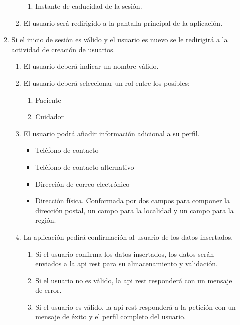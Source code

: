 \begin{enumerate}[label*=RSU \arabic*.]
\begin{enumerate}[label*=\arabic*.]
\begin{enumerate}[label*=\arabic*.]
\begin{enumerate}[label*=\arabic*.]
                \item Instante de caducidad de la sesión.
            \end{enumerate}
            \item El usuario será redirigido a la pantalla principal de la aplicación.
        \end{enumerate}
        \item \label{req:registro} Si el inicio de sesión es válido y el usuario es nuevo se le redirigirá a la actividad de creación de usuarios.
        \begin{enumerate}[label*=\arabic*.]
            \item \label{req:nombre_usuario} El usuario deberá indicar un nombre válido.
            \item \label{req:rol_usuario} El usuario deberá seleccionar un rol entre los posibles:
            \begin{enumerate}[label*=\arabic*.]
                \item Paciente
                \item Cuidador
            \end{enumerate}
            \item \label{req:info_adicional} El usuario podrá añadir información adicional a su perfil.
            \begin{itemize}
                \item Teléfono de contacto
                \item Teléfono de contacto alternativo
                \item Dirección de correo electrónico
                \item Dirección física. Conformada por dos campos para componer la dirección postal, un campo para la localidad y un campo para la región.
            \end{itemize}
            \item La aplicación pedirá confirmación al usuario de los datos insertados.
            \begin{enumerate}[label*=\arabic*.]
                \item Si el usuario confirma los datos insertados, los datos serán enviados a la \acrshort{api} \acrshort{rest} para su almacenamiento y validación.
                \item Si el usuario no es válido, la \acrshort{api} \acrshort{rest} responderá con un mensaje de error.
                \item Si el usuario es válido, la \acrshort{api} \acrshort{rest} responderá a la petición con un mensaje de éxito y el perfil completo del usuario.

\end{enumerate}
\end{enumerate}
\end{enumerate}
\end{enumerate}
